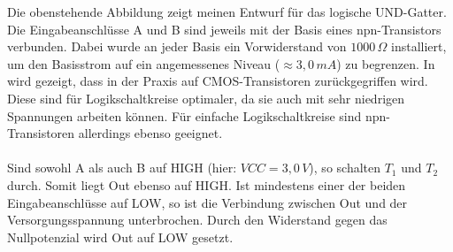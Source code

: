 Die obenstehende Abbildung zeigt meinen Entwurf für das logische UND-Gatter. Die Eingabeanschlüsse A und B sind jeweils mit der Basis eines npn-Transistors verbunden. Dabei wurde an jeder Basis ein Vorwiderstand von $1000\,\Omega$ installiert, um den Basisstrom auf ein angemessenes Niveau ($\approx 3,0\, mA$) zu begrenzen. In \cite{zimmermann1998binary} wird gezeigt, dass in der Praxis auf \glqq{}CMOS\grqq{}-Transistoren zurückgegriffen wird. Diese sind für Logikschaltkreise optimaler, da sie auch mit sehr niedrigen Spannungen arbeiten können. Für einfache Logikschaltkreise sind npn-Transistoren allerdings ebenso geeignet.\\\\
Sind sowohl A als auch B auf HIGH (hier: $VCC=3,0\,V$), so schalten $T_1$ und $T_2$ durch. Somit liegt Out ebenso auf HIGH. Ist mindestens einer der beiden Eingabeanschlüsse auf LOW, so ist die Verbindung zwischen Out und der Versorgungsspannung unterbrochen. Durch den Widerstand gegen das Nullpotenzial wird Out auf LOW gesetzt.\\
